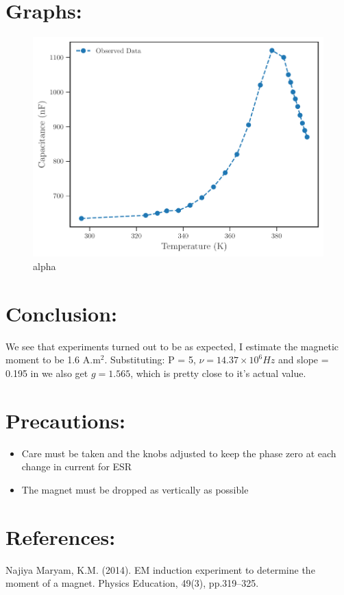 \documentclass{../_layouts/ieeeconf}
\begin{document}
\section{Graphs:}
\begin{figure}[H]
\centering
\includegraphics[width = \columnwidth]{../_assets/Capacitance.pdf}
\caption{alpha}
\label{"fig:alpha"}
\end{figure}
\section{Conclusion:}
We see that experiments turned out to be as expected, I estimate the magnetic moment to be 1.6 A.m\(^2\). Substituting: P = 5, \(\nu = 14.37 \times 10^6 Hz\) and slope = 0.195 in we also get \(g = 1.565\), which is pretty close to it's actual value.
\section{Precautions:}
\begin{itemize}
\tightlist
\item
Care must be taken and the knobs adjusted to keep the phase zero at each change in current for ESR
\item
The magnet must be dropped as vertically as possible
\end{itemize}
\section{References:}
Najiya Maryam, K.M. (2014). EM induction experiment to determine the moment of a magnet. Physics Education, 49(3), pp.319--325.
\clearpage
\end{document}
